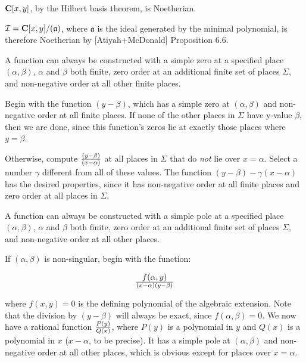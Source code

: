 ${\bf C}[x, y]$, by the Hilbert basis theorem, is Noetherian.

${\cal I} = {\bf C}[x, y]/(\mathfrak{a})$, where $\mathfrak{a}$
is the ideal generated by the minimal polynomial, is therefore
Noetherian by [Atiyah+McDonald] Proposition 6.6.

\endtheorem

\theorem
\label{simple zero construction}

A function can always be constructed with a simple zero at a specified
place $(\alpha, \beta)$, $\alpha$ and $\beta$ both finite, zero order
at an additional finite set of places $\Sigma$, and non-negative order
at all other finite places.

\proof

Begin with the function $(y-\beta)$, which has a simple zero at
$(\alpha, \beta)$ and non-negative order at all finite places.  If
none of the other places in $\Sigma$ have y-value $\beta$, then we are
done, since this function's zeros lie at exactly those places where $y
= \beta$.

Otherwise, compute $(y-\beta)\over(x-\alpha)$ at all places in $\Sigma$
that do {\it not} lie over $x = \alpha$.  Select a number
$\gamma$ different from all of these values.  The function
$(y-\beta) - \gamma (x-\alpha)$ has the desired properties, since
it has non-negative order at all finite places and zero order at
all places in $\Sigma$.

\endtheorem

\theorem
\label{simple pole construction}

A function can always be constructed with a simple pole at a specified
place $(\alpha, \beta)$, $\alpha$ and $\beta$ both finite, zero order
at an additional finite set of places $\Sigma$, and non-negative order
at all other places.

\proof

If $(\alpha, \beta)$ is non-singular, begin with the function:

$$f(\alpha,y)\over(x-\alpha)(y-\beta)$$

where $f(x,y)=0$ is the defining polynomial of the algebraic extension.
Note that the division by $(y-\beta)$ will always be exact, since
$f(\alpha, \beta)=0$.  We now have a rational function
$P(y)\over Q(x)$, where $P(y)$ is a polynomial in $y$ and $Q(x)$ is a
polynomial in $x$ ($x-\alpha$, to be precise).  It has a simple pole at
$(\alpha, \beta)$ and non-negative order at all other places, which
is obvious except for places over $x=\alpha$.

